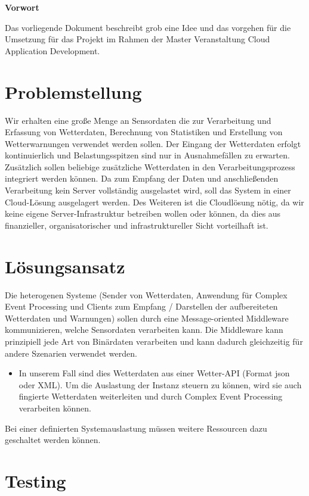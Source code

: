\documentclass[paper,oneside,onecolumn,notitlepage,bibtotocnumbered,fontsize=12pt,bigheadings,ngerman]{scrartcl}
\newcommand{\sectionnumbering}[1]{%
  \setcounter{section}{0}%
   \renewcommand{\thesection}{\csname #1\endcsname{section}}}
\begin{document}




{\Large \textbf{Vorwort}}
\bigskip

Das vorliegende Dokument beschreibt grob eine Idee und das vorgehen für die Umsetzung für das Projekt im Rahmen der Master Veranstaltung Cloud Application Development.




\normalsize


\setlength{\parindent}{0pt}

\newpage
\sectionnumbering{Roman} 
\tableofcontents
\clearpage

\listoffigures 
\clearpage 

\listoftables 
\clearpage
{} 
\sectionnumbering{arabic} 

\section{Problemstellung}
Wir erhalten eine große Menge an Sensordaten die zur Verarbeitung und Erfassung von Wetterdaten, Berechnung von Statistiken und Erstellung von Wetterwarnungen verwendet werden sollen. Der Eingang der Wetterdaten erfolgt kontinuierlich und Belastungsspitzen sind nur in Ausnahmefällen zu erwarten. Zusätzlich sollen beliebige zusätzliche Wetterdaten in den Verarbeitungsprozess integriert werden können. 
Da zum Empfang der Daten und anschließenden Verarbeitung kein Server vollständig ausgelastet wird, soll das System in einer Cloud-Lösung ausgelagert werden. 
Des Weiteren ist die Cloudlösung nötig, da wir keine eigene Server-Infrastruktur betreiben wollen oder können, da dies aus finanzieller, organisatorischer und infrastruktureller Sicht vorteilhaft ist.

\section{Lösungsansatz}
Die heterogenen Systeme (Sender von Wetterdaten, Anwendung für Complex Event Processing und Clients zum Empfang / Darstellen der aufbereiteten Wetterdaten und Warnungen) sollen durch eine Message-oriented Middleware kommunizieren, welche Sensordaten verarbeiten kann. Die Middleware kann prinzipiell jede Art von Binärdaten verarbeiten und kann dadurch gleichzeitig für andere Szenarien verwendet werden. 
\begin{itemize}
\item In unserem Fall sind dies Wetterdaten aus einer Wetter-API (Format json oder XML). Um die Auslastung der Instanz steuern zu können, wird sie auch fingierte Wetterdaten weiterleiten und durch Complex Event Processing verarbeiten können. 
\end{itemize} 
Bei einer definierten Systemauslastung müssen weitere Ressourcen dazu geschaltet werden können. 

\section{Testing}
\end{document}
